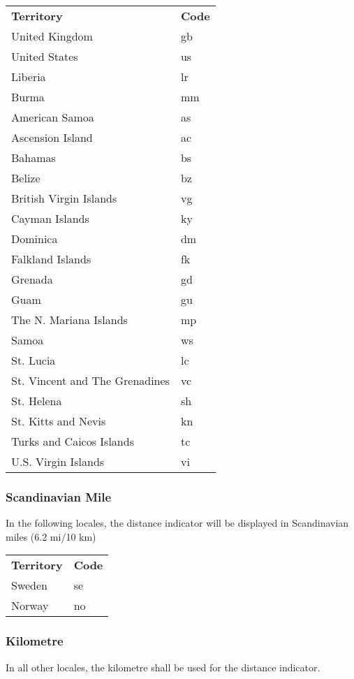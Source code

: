 \documentclass[12pt, a4paper]{article}
\begin{document}
\begin{table}[h]
\centering
\label{my-label}
\begin{tabular}{ll}
\textbf{Territory} & \textbf{Code}\\
United Kingdom & gb\\
United States & us\\
Liberia & lr\\
Burma & mm\\
American Samoa & as\\
Ascension Island & ac\\
Bahamas & bs\\
Belize & bz\\
British Virgin Islands & vg\\
Cayman Islands & ky\\
Dominica & dm\\
Falkland Islands & fk\\
Grenada & gd\\
Guam & gu\\
The N. Mariana Islands & mp\\
Samoa & ws\\
St. Lucia & lc\\
St. Vincent and The Grenadines & vc\\
St. Helena & sh\\
St. Kitts and Nevis & kn\\
Turks and Caicos Islands & tc\\
U.S. Virgin Islands & vi\\
\end{tabular}
\end{table}

\subsubsection{Scandinavian Mile}
In the following locales, the distance indicator will be displayed in Scandinavian miles (6.2 mi/10 km)
\begin{table}[h]
\centering
\label{my-label}
\begin{tabular}{ll}
\textbf{Territory} & \textbf{Code}\\
Sweden & se\\
Norway & no\\
\end{tabular}
\end{table}

\subsubsection{Kilometre}
In all other locales, the kilometre shall be used for the distance indicator. 
\end{document}
